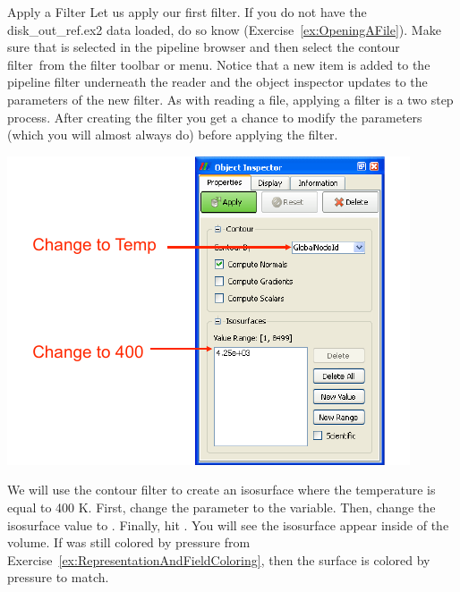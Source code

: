 \begin{exercise}{Apply a Filter}
  \label{ex:ApplyAFilter}%
  Let us apply our first filter.  If you do not have the disk\_out\_ref.ex2
  data loaded, do so know (Exercise~\ref{ex:OpeningAFile}).  Make sure that
   is selected in the pipeline browser and then
  select the contour filter~\contour from the filter toolbar or
   menu.  Notice that a new item is added to the pipeline
  filter underneath the reader and the object inspector updates to the
  parameters of the new filter.  As with reading a file, applying a filter
  is a two step process.  After creating the filter you get a chance to
  modify the parameters (which you will almost always do) before applying
  the filter.

  \begin{inlinefig}
    \includegraphics[scale=\bbscale]{images/ContourOptions}
  \end{inlinefig}

  We will use the contour filter to create an isosurface where the
  temperature is equal to 400 K.  First, change the 
  parameter to the  variable.  Then, change the isosurface value
  to .  Finally, hit \apply.  You will see the isosurface appear
  inside of the volume.  If  was still colored by
  pressure from Exercise~\ref{ex:RepresentationAndFieldColoring}, then the
  surface is colored by pressure to match.


\end{exercise}
